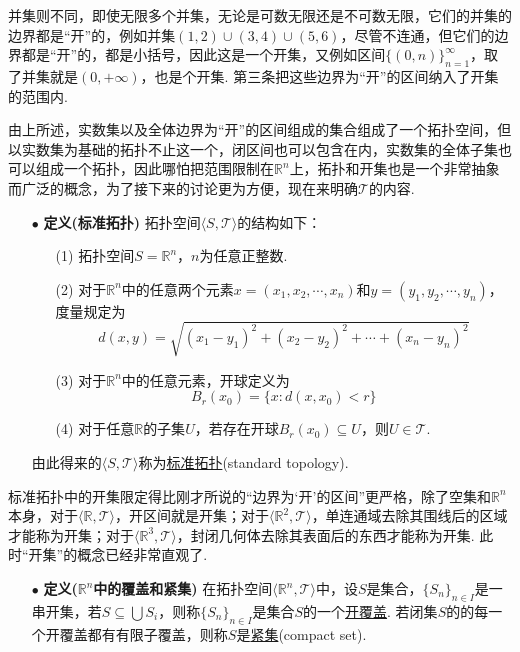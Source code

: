 \documentclass[main.tex]{subfiles}
\begin{document}
并集则不同，即使无限多个并集，无论是可数无限还是不可数无限，它们的并集的边界都是“开”的，例如并集\((1,2)\cup(3,4)\cup(5,6)\)，尽管不连通，但它们的边界都是“开”的，都是小括号，因此这是一个开集，又例如区间\(\{(0,n)\}_{n=1}^{\infty}\)，取了并集就是\((0,+\infty)\)，也是个开集. 第三条把这些边界为“开”的区间纳入了开集的范围内.

由上所述，实数集以及全体边界为“开”的区间组成的集合组成了一个拓扑空间，但以实数集为基础的拓扑不止这一个，闭区间也可以包含在内，实数集的全体子集也可以组成一个拓扑，因此哪怕把范围限制在\(\mathbb{R}^n\)上，拓扑和开集也是一个非常抽象而广泛的概念，为了接下来的讨论更为方便，现在来明确\(\mathcal{T}\)的内容.

\begin{itemize}
    \item [\(\bullet\)] \textbf{定义(标准拓扑)}
    \newline
    拓扑空间\(\langle S, \mathcal{T} \rangle\)的结构如下：
    \begin{itemize}
        \item[(1)] 拓扑空间\(S=\mathbb{R}^n\)，\(n\)为任意正整数.
        \item[(2)] 对于\(\mathbb{R}^n\)中的任意两个元素\(x=(x_1, x_2, \cdots, x_n)\)和\(y=(y_1,y_2,\cdots,y_n)\)，度量规定为
        \[d(x,y)=\sqrt{(x_1-y_1)^2+(x_2-y_2)^2+\cdots+(x_n-y_n)^2}\]
        \item[(3)] 对于\(\mathbb{R}^n\)中的任意元素，开球定义为
        \[B_r(x_0) = \{x: d(x,x_0) < r\}\]
        \item[(4)] 对于任意\(\mathbb{R}\)的子集\(U\)，若存在开球\(B_r(x_0) \subseteq U\)，则\(U \in \mathcal{T}\).
    \end{itemize}
    由此得来的\(\langle S, \mathcal{T} \rangle\)称为\uline{标准拓扑}(standard topology).
\end{itemize}

标准拓扑中的开集限定得比刚才所说的“边界为‘开’的区间”更严格，除了空集和\(\mathbb{R}^n\)本身，对于\(\langle \mathbb{R}, \mathcal{T} \rangle\)，开区间就是开集；对于\(\langle \mathbb{R}^2, \mathcal{T} \rangle\)，单连通域去除其围线后的区域才能称为开集；对于\(\langle \mathbb{R}^3, \mathcal{T} \rangle\)，封闭几何体去除其表面后的东西才能称为开集. 此时“开集”的概念已经非常直观了.

\begin{itemize}
    \item [\(\bullet\)] \textbf{定义(\(\mathbb{R}^n\)中的覆盖和紧集)}
    \newline
    在拓扑空间\(\langle \mathbb{R}^n,\mathcal{T} \rangle \)中，设\(S\)是集合，\(\{S_n\}_{n \in I}\)是一串开集，若\(S \subseteq \bigcup S_i\)，则称\(\{S_n\}_{n \in I}\)是集合\(S\)的一个\uline{开覆盖}.
    \newline
    若闭集\(S\)的的每一个开覆盖都有有限子覆盖，则称\(S\)是\uline{紧集}(compact set).
\end{itemize}
\end{document}
